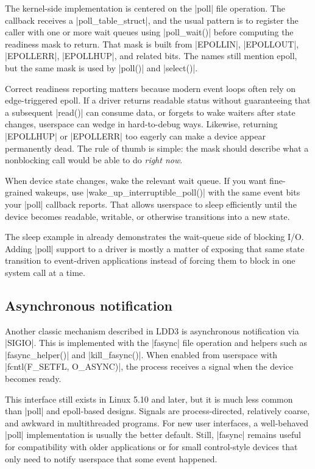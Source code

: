 \documentclass[10pt, oneside]{book}
\begin{document}
The kernel-side implementation is centered on the \cpp|poll| file operation.
The callback receives a \cpp|poll_table_struct|, and the usual pattern is to
register the caller with one or more wait queues using \cpp|poll_wait()| before
computing the readiness mask to return.
That mask is built from \cpp|EPOLLIN|, \cpp|EPOLLOUT|, \cpp|EPOLLERR|,
\cpp|EPOLLHUP|, and related bits.
The names still mention epoll, but the same mask is used by \cpp|poll()| and
\cpp|select()|.

Correct readiness reporting matters because modern event loops often rely on
edge-triggered epoll.
If a driver returns readable status without guaranteeing that a subsequent
\cpp|read()| can consume data, or forgets to wake waiters after state changes,
userspace can wedge in hard-to-debug ways.
Likewise, returning \cpp|EPOLLHUP| or \cpp|EPOLLERR| too eagerly can make a
device appear permanently dead.
The rule of thumb is simple: the mask should describe what a nonblocking call
would be able to do \emph{right now}.

When device state changes, wake the relevant wait queue.
If you want fine-grained wakeups, use \cpp|wake_up_interruptible_poll()| with
the same event bits your \cpp|poll| callback reports.
That allows userspace to sleep efficiently until the device becomes readable,
writable, or otherwise transitions into a new state.

The sleep example in  already demonstrates the wait-queue side
of blocking I/O.
Adding \cpp|poll| support to a driver is mostly a matter of exposing that same
state transition to event-driven applications instead of forcing them to block
in one system call at a time.

\subsection{Asynchronous notification}
\label{sec:async_notification}
Another classic mechanism described in LDD3 is asynchronous notification via
\cpp|SIGIO|.
This is implemented with the \cpp|fasync| file operation and helpers such as
\cpp|fasync_helper()| and \cpp|kill_fasync()|.
When enabled from userspace with \cpp|fcntl(F\_SETFL, O\_ASYNC)|, the process
receives a signal when the device becomes ready.

This interface still exists in Linux 5.10 and later, but it is much less common than
\cpp|poll| and epoll-based designs.
Signals are process-directed, relatively coarse, and awkward in multithreaded
programs.
For new user interfaces, a well-behaved \cpp|poll| implementation is usually
the better default.
Still, \cpp|fasync| remains useful for compatibility with older applications or
for small control-style devices that only need to notify userspace that some
event happened.
\end{document}
